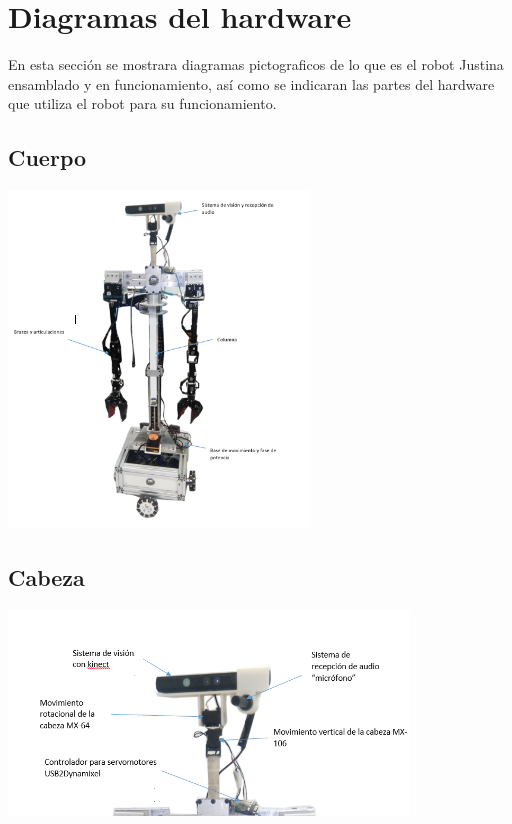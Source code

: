 \documentclass[a4paper]{book}
\begin{document}
\section{Diagramas del hardware}

En esta sección se mostrara diagramas pictograficos de lo que es el robot Justina ensamblado y en funcionamiento, así como se indicaran las partes del hardware que utiliza el robot para su funcionamiento.
\subsection{Cuerpo}

\begin{center}
\includegraphics[width=0.6\textwidth]{Figures/Hardware/Diagramas/Cuerpo.png}
\label{fig:Hardware:Diagramas:Justina:Completa}
\end{center}

\subsection{Cabeza}
\begin{center}
\includegraphics[width=0.8\textwidth]{Figures/Hardware/Diagramas/Cabeza.png}
\label{fig:Hardware:Diagramas:Imagen:Cabeza}
\end{center}
\end{document}
